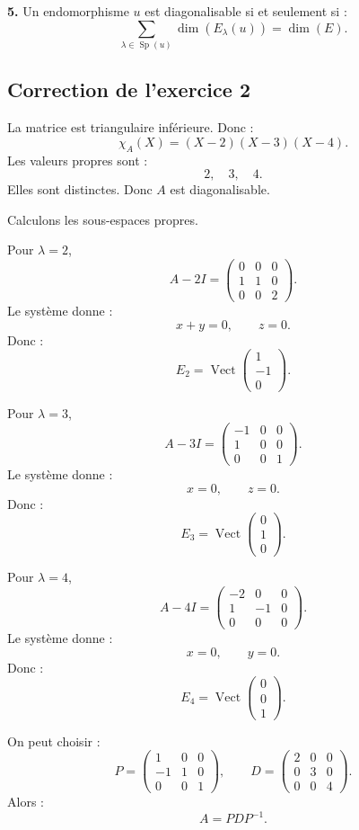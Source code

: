 \documentclass[11pt,a4paper]{article}
\newcommand{\Vect}{\operatorname{Vect}}
\newcommand{\Sp}{\operatorname{Sp}}
\begin{document}
\textbf{5.}  
Un endomorphisme \(u\) est diagonalisable si et seulement si :
\[
\sum_{\lambda\in\Sp(u)}\dim(E_\lambda(u))=\dim(E).
\]

\subsection*{Correction de l'exercice 2}

La matrice est triangulaire inférieure.  
Donc :
\[
\chi_A(X)=(X-2)(X-3)(X-4).
\]
Les valeurs propres sont :
\[
2,\quad3,\quad4.
\]
Elles sont distinctes.  
Donc \(A\) est diagonalisable.

Calculons les sous-espaces propres.

Pour \(\lambda=2\),
\[
A-2I=
\begin{pmatrix}
0&0&0\\
1&1&0\\
0&0&2
\end{pmatrix}.
\]
Le système donne :
\[
x+y=0,\qquad z=0.
\]
Donc :
\[
E_2=\Vect
\begin{pmatrix}
1\\-1\\0
\end{pmatrix}.
\]

Pour \(\lambda=3\),
\[
A-3I=
\begin{pmatrix}
-1&0&0\\
1&0&0\\
0&0&1
\end{pmatrix}.
\]
Le système donne :
\[
x=0,\qquad z=0.
\]
Donc :
\[
E_3=\Vect
\begin{pmatrix}
0\\1\\0
\end{pmatrix}.
\]

Pour \(\lambda=4\),
\[
A-4I=
\begin{pmatrix}
-2&0&0\\
1&-1&0\\
0&0&0
\end{pmatrix}.
\]
Le système donne :
\[
x=0,\qquad y=0.
\]
Donc :
\[
E_4=\Vect
\begin{pmatrix}
0\\0\\1
\end{pmatrix}.
\]

On peut choisir :
\[
P=
\begin{pmatrix}
1&0&0\\
-1&1&0\\
0&0&1
\end{pmatrix},
\qquad
D=
\begin{pmatrix}
2&0&0\\
0&3&0\\
0&0&4
\end{pmatrix}.
\]
Alors :
\[
A=PDP^{-1}.
\]
\end{document}
